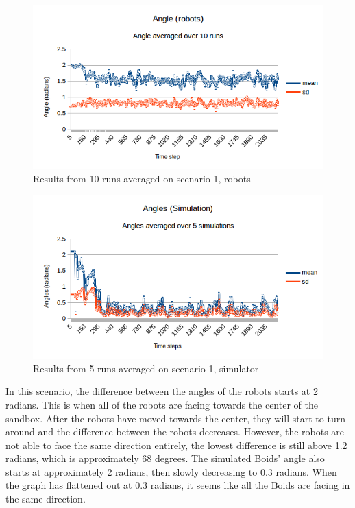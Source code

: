 \begin{figure}[h]
\begin{center}
\includegraphics[width=0.8\linewidth]{figs/runs/1pangle}
\end{center}
\caption[1. Angle, robots]{Results from 10 runs averaged on scenario 1, robots}
\label{fig:res1pang}
\end{figure}
\begin{figure}[h]
\begin{center}
\includegraphics[width=0.8\linewidth]{figs/runs/1sangle}
\end{center}
\caption[1. Angle, Simulation]{Results from 5 runs averaged on scenario 1, simulator}
\label{fig:res1sang}
\end{figure}

In this scenario, the difference between the angles of the robots starts at 2 radians. This is when all of the robots are facing towards the center of the sandbox. After the robots have moved towards the center, they will start to turn around and the difference between the robots decreases. However, the robots are not able to face the same direction entirely, the lowest difference is still above 1.2 radians, which is approximately 68 degrees. 
The simulated Boids' angle also starts at approximately 2 radians, then slowly decreasing to 0.3 radians. When the graph has flattened out at 0.3 radians, it seems like all the Boids are facing in the same direction.


